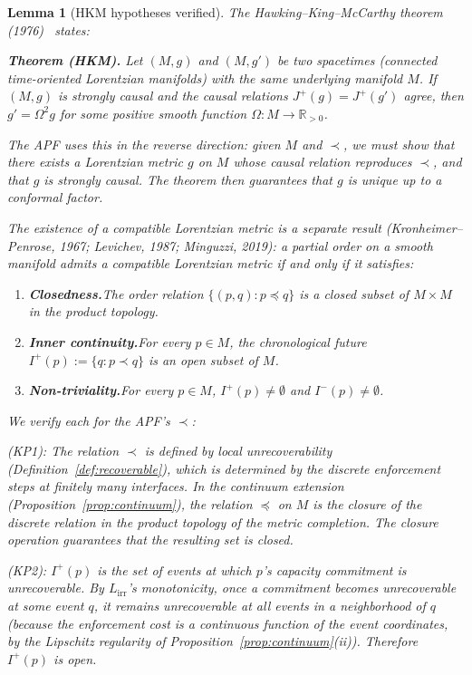 \documentclass[11pt,a4paper]{article}
\newtheorem{lemma}[theorem]{Lemma}
\theoremstyle{definition}
\begin{document}
\begin{lemma}[HKM hypotheses verified]\label{lem:HKM_hyp}
The Hawking--King--McCarthy theorem (1976)~\cite{HKM1976} states:

\smallskip\noindent\textbf{Theorem (HKM).}\quad
\textit{Let $(M, g)$ and $(M, g')$ be two spacetimes (connected
time-oriented Lorentzian manifolds) with the same underlying manifold
$M$.  If $(M, g)$ is strongly causal and the causal relations
$J^+(g) = J^+(g')$ agree, then $g' = \Omega^2 g$ for some positive
smooth function $\Omega: M \to \mathbb{R}_{>0}$.}

\smallskip\noindent The APF uses this in the reverse direction: given
$M$ and $\prec$, we must show that \emph{there exists} a Lorentzian
metric $g$ on $M$ whose causal relation reproduces $\prec$, and that
$g$ is strongly causal.  The theorem then guarantees that $g$ is unique
up to a conformal factor.

The existence of a compatible Lorentzian metric is a separate result
(Kronheimer--Penrose, 1967; Levichev, 1987; Minguzzi, 2019): a
partial order on a smooth manifold admits a compatible Lorentzian
metric if and only if it satisfies:
\begin{enumerate}[label=(KP\arabic*),nosep]
  \item \textbf{Closedness.}\quad The order relation
  $\{(p,q) : p \preceq q\}$ is a closed subset of $M \times M$ in the
  product topology.
  \item \textbf{Inner continuity.}\quad For every $p \in M$, the
  chronological future $I^+(p) := \{q : p \prec q\}$ is an open
  subset of $M$.
  \item \textbf{Non-triviality.}\quad For every $p \in M$,
  $I^+(p) \ne \emptyset$ and $I^-(p) \ne \emptyset$.
\end{enumerate}
We verify each for the APF's $\prec$:

(KP1): The relation $\prec$ is defined by local unrecoverability
(Definition~\ref{def:recoverable}), which is determined by the
discrete enforcement steps at finitely many interfaces.  In the
continuum extension (Proposition~\ref{prop:continuum}), the relation
$\preceq$ on $M$ is the closure of the discrete relation in the
product topology of the metric completion.  The closure operation
guarantees that the resulting set is closed.

(KP2): $I^+(p)$ is the set of events at which $p$'s capacity
commitment is unrecoverable.  By $L_{\mathrm{irr}}$'s monotonicity,
once a commitment becomes unrecoverable at some event $q$, it remains
unrecoverable at all events in a neighborhood of $q$ (because the
enforcement cost is a continuous function of the event coordinates, by
the Lipschitz regularity of Proposition~\ref{prop:continuum}(ii)).
Therefore $I^+(p)$ is open.


\end{lemma}
\end{document}
